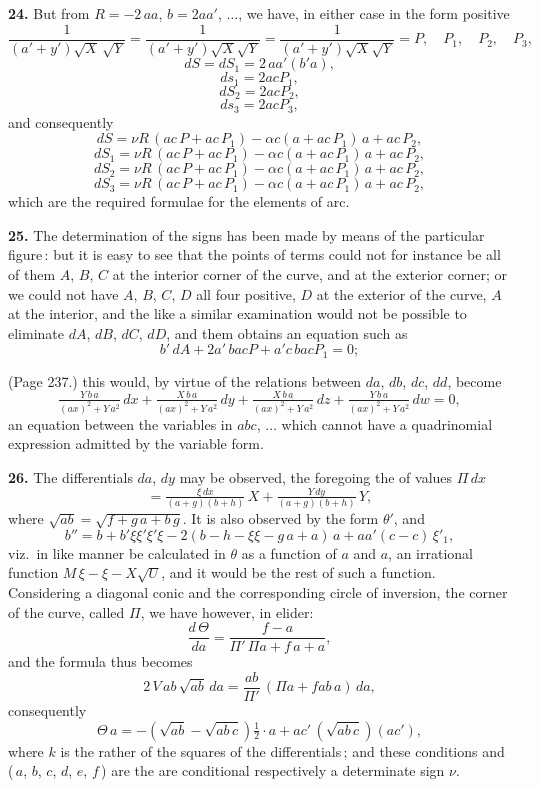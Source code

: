 \documentclass[11pt,a4paper]{article}
\theoremstyle{plain}
\theoremstyle{definition}
\begin{document}
\medskip

\noindent\textbf{24.} But from $R = -2\,a a$, $b = 2 a a'$, $\ldots$, we have, in either case in the form positive
\[
\frac{1}{(a' + y')\sqrt{X}\,\sqrt{Y}} = \frac{1}{(a' + y')\sqrt{X}\sqrt{Y}} = \frac{1}{(a' + y')\sqrt{X}\sqrt{Y}} = P, \quad P_1,\quad P_2,\quad P_3,
\]
\[
dS = dS_1 = 2\,a a' (b' a),
\]
\[
ds_1 = 2 a c P_1,
\]
\[
dS_2 = 2 a c P_2,
\]
\[
ds_3 = 2 a c P_3,
\]
and consequently
\[
d S = \nu R\,(a c\,P + a c\,P_1) - \alpha c (a + a c\,P_1)\,a + a c\,P_2,
\]
\[
dS_1 = \nu R\,(a c\,P + a c\,P_1) - \alpha c (a + a c\,P_1)\,a + a c\,P_2,
\]
\[
dS_2 = \nu R\,(a c\,P + a c\,P_1) - \alpha c (a + a c\,P_1)\,a + a c\,P_2,
\]
\[
dS_3 = \nu R\,(a c\,P + a c\,P_1) - \alpha c (a + a c\,P_1)\,a + a c\,P_2,
\]
which are the required formulae for the elements of arc.

\medskip

\noindent\textbf{25.} The determination of the signs has been made by means of the particular figure\,: but it is easy to see that the points of terms could not for instance be all of them $A$, $B$, $C$ at the interior corner of the curve, and at the exterior corner; or we could not have $A$, $B$, $C$, $D$ all four positive, $D$ at the exterior of the curve, $A$ at the interior, and the like a similar examination would not be possible to eliminate $dA$, $dB$, $dC$, $dD$, and them obtains an equation such as
\[
b'\,dA + 2 a'\,b a c P + a' c\,b a c P_1 = 0;
\]

\medskip

\noindent (Page 237.) this would, by virtue of the relations between $da$, $db$, $dc$, $dd$, become
\[
\tfrac{Y\,b\,a}{(a x)^2 + Y\,a^2}\,dx + \tfrac{X\,b\,a}{(a x)^2 + Y\,a^2}\,dy + \tfrac{X\,b\,a}{(a x)^2 + Y\,a^2}\,dz + \tfrac{Y\,b\,a}{(a x)^2 + Y\,a^2}\,dw = 0,
\]
an equation between the variables in $abc$, $\ldots$ which cannot have a quadrinomial expression admitted by the variable form.

\medskip

\noindent\textbf{26.} The differentials $da$, $dy$ may be observed, the foregoing the of values $\Pi\,dx$
\[
= \tfrac{\xi\,d x}{(a + g)(b + h)} \,X + \tfrac{Y\,d y}{(a + g)(b + h)}\,Y,
\]
where $\sqrt{a b} = \sqrt{f + g\,a + b\,g}$. It is also observed by the form $\theta'$, and
\[
b'' = b + b'\xi\xi'\xi'\xi - 2(b - h - \xi\xi - g\,a + a)\,a + a a'(c - c)\,\xi'_1,
\]
viz.\ in like manner be calculated in $\theta$ as a function of $a$ and $a$, an irrational function $M\,\xi - \xi - X\sqrt{U}$, and it would be the rest of such a function. Considering a diagonal conic and the corresponding circle of inversion, the corner of the curve, called $\Pi$, we have however, in elider:
\[
\frac{d\,\Theta}{d a} = \frac{f - a}{\Pi'\,\Pi a + f\,a + a},
\]
and the formula thus becomes
\[
2\,V\,a b\,\sqrt{a b}\,da = \frac{a b}{\Pi'}\,(\Pi a + f a b\,a)\,da,
\]
consequently
\[
\Theta\,a = - (\sqrt{a b} - \sqrt{a b\,c})\tfrac{1}{2} \cdot a + a c'\,(\sqrt{a b\,c}) (a c'),
\]
where $k$ is the rather of the squares of the differentials\,; and these conditions and (\,$a$, $b$, $c$, $d$, $e$, $f$\,) are the are conditional respectively a determinate sign $\nu$.
\end{document}
